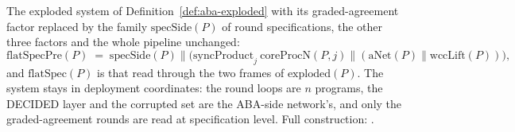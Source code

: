 \begin{definition}
  \label{def:aba-flatspec}
  \leanok
  The exploded system of Definition~\ref{def:aba-exploded} with its graded-agreement factor replaced by the family $\mathrm{specSide}(P)$ of round specifications, the other three factors and the whole pipeline unchanged:
  \[
    \mathrm{flatSpecPre}(P) \;=\;
      \mathrm{specSide}(P) \parallel \bigl(\mathrm{syncProduct}_{j}\ \mathrm{coreProcN}(P,j)
        \parallel (\mathrm{aNet}(P) \parallel \mathrm{wccLift}(P))\bigr),
  \]
  and $\mathrm{flatSpec}(P)$ is that read through the two frames of $\mathrm{exploded}(P)$.
  The system stays in deployment coordinates: the round loops are $n$ programs, the DECIDED layer and the corrupted set are the ABA-side network's, and only the graded-agreement rounds are read at specification level.
  Full construction: .
\end{definition}
